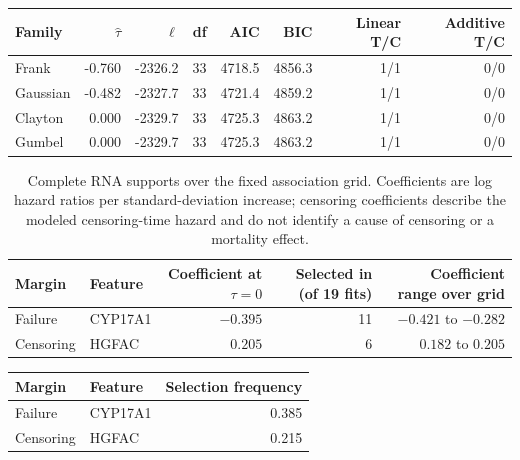 \begin{table}[!htbp]
\centering

\label{tab:luad-profile}
\small
\begin{tabular}{lrrrrrrr}
\toprule
Family & $\widehat\tau$ & $\ell$ & df & AIC & BIC & Linear T/C & Additive T/C\\
\midrule
Frank & -0.760 & -2326.2 & 33 & 4718.5 & 4856.3 & 1/1 & 0/0 \\
Gaussian & -0.482 & -2327.7 & 33 & 4721.4 & 4859.2 & 1/1 & 0/0 \\
Clayton & 0.000 & -2329.7 & 33 & 4725.3 & 4863.2 & 1/1 & 0/0 \\
Gumbel & 0.000 & -2329.7 & 33 & 4725.3 & 4863.2 & 1/1 & 0/0 \\
\bottomrule
\end{tabular}
\end{table}

\begin{table}[!htbp]
\centering
\caption{Complete RNA supports over the fixed association grid. Coefficients are log hazard ratios per standard-deviation increase; censoring coefficients describe the modeled censoring-time hazard and do not identify a cause of censoring or a mortality effect.}
\label{tab:luad-support-full}
\small
\begin{tabular}{llrrr}
\toprule
Margin & Feature & Coefficient at $\tau=0$ & Selected in (of 19 fits) & Coefficient range over grid\\
\midrule
Failure & CYP17A1 & $-0.395$ & 11 & $-0.421$ to $-0.282$ \\
Censoring & HGFAC & $0.205$ & 6 & $0.182$ to $0.205$ \\
\bottomrule
\end{tabular}
\end{table}

\begin{table}[!htbp]
\centering

\label{tab:luad-subsampling-full-support}
\begin{tabular}{llr}
\toprule
Margin & Feature & Selection frequency \\
\midrule
Failure & CYP17A1 & 0.385 \\
\midrule
Censoring & HGFAC & 0.215 \\
\bottomrule
\end{tabular}
\end{table}


